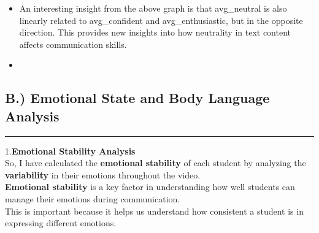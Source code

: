 \documentclass{article}
\begin{document}
\begin{itemize}
\begin{center}
      \caption{Correlation Diagram for Text Scores with Confidence and Enthusiasm}
      \label{fig:correlation-diagram}
  \end{center}
      
    \item An interesting insight from the above graph is that avg\_neutral is also linearly related to avg\_confident and avg\_enthusiastic, but in the opposite direction. This provides new insights into how neutrality in text content affects communication skills.
    
    \item 
    \vspace{0.1in}
\end{itemize}


\subsection{B.) Emotional State and Body Language Analysis}

\begin{center}
    \color{green}\rule{1\linewidth}{0.7mm}
\end{center}

1.\textbf{Emotional Stability Analysis} \\
So, I have calculated the \textbf{emotional stability} of each student by analyzing the \textbf{variability} in their emotions throughout the video.\\  

\textbf{Emotional stability} is a key factor in understanding how well students can manage their emotions during communication.\\
This is important because it helps us understand how consistent a student is in expressing different emotions.\\
\end{document}
